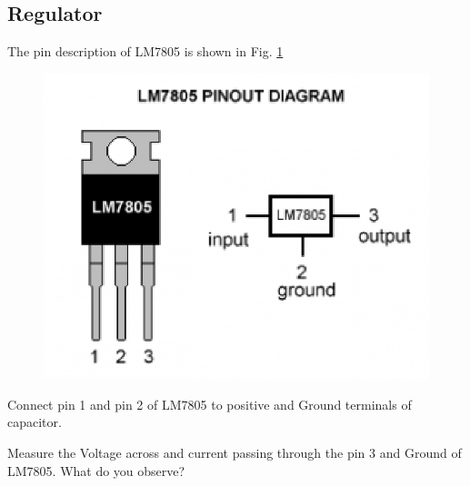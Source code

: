 \documentclass[journal,12pt,twocolumn]{IEEEtran}
\begin{document}
\subsection{Regulator}
The pin description of LM7805 is shown in Fig. \ref{fig3}
\begin{figure}[h]
\centering
	\includegraphics[scale=0.4]{./figs/Lm7805.eps}
	\caption{}  \label{fig3}
    \end{figure}

\begin{problem}
Connect pin 1 and pin 2 of LM7805 to positive and Ground terminals of capacitor. 
\end{problem} 
\begin{problem}
Measure the Voltage across  and current passing through the pin 3 and Ground of LM7805. What do you observe?
\end{problem}
\end{document}
